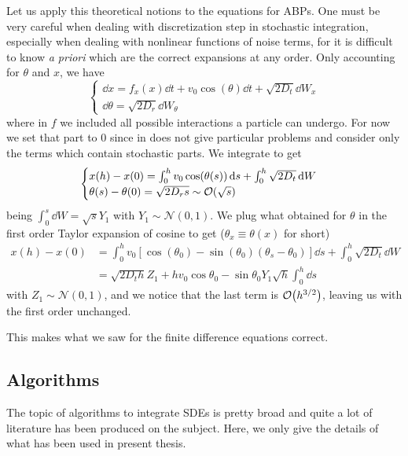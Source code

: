 \documentclass[../../master_thesis_np.tex]{subfiles}
\begin{document}
		Let us apply this theoretical notions to the equations for ABPs. 
		One must be very careful when dealing with discretization step in stochastic integration, especially when dealing with nonlinear functions of noise terms, for it is difficult to know \emph{a priori} which are the correct expansions at any order. 
		Only accounting for $\theta$ and $x$, we have
		\begin{equation} 
			\begin{cases}
			\dd{x} = f_x(x)\dd{t} + v_0\cos(\theta)\dd{t} + \sqrt{2D_t}\dd{W_x} \\
			\dd{\theta} = \sqrt{2D_r}\dd{W_\theta}
			\end{cases} 
		\end{equation} 
		where in $f$ we included all possible interactions a particle can undergo. 
		For now we set that part to 0 since in does not give particular problems and consider only the terms which contain stochastic parts. 
		We integrate to get
		\begin{equation}
			\begin{cases}
				x(h) - x(0) =  \int_{0}^{h}v_0 \cos(\theta(s)) \dd{s} + \int_{0}^{h} \sqrt{2D_t}\dd{W} \\
			\theta(s) - \theta(0) = \sqrt{2D_r s} \sim \order{\sqrt{s}}
		    \end{cases}  
	    \end{equation}
		being $\int_{0}^{s}\dd{W} = \sqrt{s} Y_1$ with $Y_1 \sim \mathcal{N}(0,1)$. 
		We plug what obtained for $\theta$ in the first order Taylor expansion of cosine to get ($\theta_x \equiv \theta(x)$ for short)
		\begin{align} 
			x(h) - x(0) &=  \int_{0}^{h}v_0 \left[\cos(\theta_0) - \sin(\theta_0)(\theta_s-\theta_0)\right]\dd{s} + \int_{0}^{h} \sqrt{2D_t}\dd{W}  \\
			& = \sqrt{2D_th} Z_1 + hv_0 \cos\theta_0 - \sin \theta_0 Y_1 \sqrt{h} \int_{0}^{h}\dd{s}
	    \end{align}
	    with $Z_1 \sim \mathcal{N}(0,1)$, and we notice that the last term is $\order{h^{3/2}}$, leaving us with the first order unchanged.
	    
	    This makes what we saw for the finite difference equations correct.
	    
		\subsection{Algorithms}
		The topic of algorithms to integrate SDEs is pretty broad and quite a lot of literature has been produced on the subject. 
		Here, we only give the details of what has been used in present thesis.
		
\end{document}
